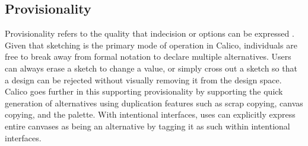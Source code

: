 \documentclass[12pt,fleqn]{ucithesis}
\begin{document}



\subsection{Provisionality}
Provisionality refers to the quality that indecision or options can be expressed \cite{Petre2013BookChapter}. Given that sketching is the primary mode of operation in Calico, individuals are free to break away from formal notation to declare multiple alternatives. Users can always erase a sketch to change a value, or simply cross out a sketch so that a design can be rejected without visually removing it from the design space. Calico goes further in this supporting provisionality by supporting the quick generation of alternatives using duplication features such as scrap copying, canvas copying, and the palette. With intentional interfaces, uses can explicitly express entire canvases as being an alternative by tagging it as such within intentional interfaces.
\end{document}
